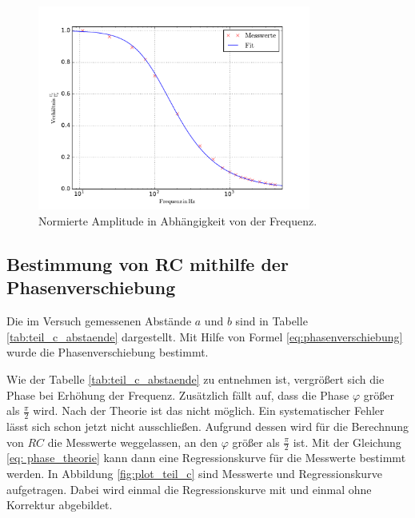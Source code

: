 \begin{figure}
  \centering
  \includegraphics[width=0.8\textwidth]{pics/u_cdurchu_g.pdf}
  \caption{Normierte Amplitude in Abhängigkeit von der Frequenz.}
  \label{fig:teilb}
\end{figure}

\subsection{Bestimmung von RC mithilfe der Phasenverschiebung}
Die im Versuch gemessenen Abstände $a$ und $b$ sind in Tabelle \ref{tab:teil_c_abstaende}
dargestellt. Mit Hilfe von Formel \eqref{eq:phasenverschiebung} wurde die %
Phasenverschiebung bestimmt.



Wie der Tabelle \ref{tab:teil_c_abstaende} zu entnehmen ist, vergrößert sich die Phase
bei Erhöhung der Frequenz.
Zusätzlich fällt auf, dass die Phase $\varphi$ größer als $\frac{\pi}{2}$ wird. %
Nach der Theorie ist das nicht möglich.
Ein systematischer Fehler lässt sich schon jetzt nicht ausschließen.
Aufgrund dessen wird für die Berechnung von $RC$ die Messwerte weggelassen, an den %
$\varphi$ größer als $\frac{\pi}{2}$ ist.
Mit der Gleichung \eqref{eq: phase_theorie} kann dann eine Regressionskurve für die %
Messwerte bestimmt werden.
In Abbildung \ref{fig:plot_teil_c} sind Messwerte und Regressionskurve aufgetragen.
Dabei wird einmal die Regressionskurve mit und einmal ohne Korrektur abgebildet.


